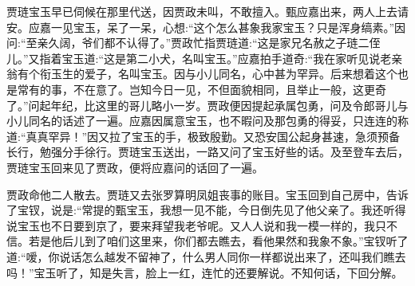 \begin{parag}
    贾琏宝玉早已伺候在那里代送，因贾政未叫，不敢擅入。甄应嘉出来，两人上去请安。应嘉一见宝玉，呆了一呆，心想:“这个怎么甚象我家宝玉？只是浑身缟素。”因问:“至亲久阔，爷们都不认得了。”贾政忙指贾琏道:“这是家兄名赦之子琏二侄儿。”又指着宝玉道:“这是第二小犬，名叫宝玉。”应嘉拍手道奇:“我在家听见说老亲翁有个衔玉生的爱子，名叫宝玉。因与小儿同名，心中甚为罕异。后来想着这个也是常有的事，不在意了。岂知今日一见，不但面貌相同，且举止一般，这更奇了。”问起年纪，比这里的哥儿略小一岁。贾政便因提起承属包勇，问及令郎哥儿与小儿同名的话述了一遍。应嘉因属意宝玉，也不暇问及那包勇的得妥，只连连的称道:“真真罕异！”因又拉了宝玉的手，极致殷勤。又恐安国公起身甚速，急须预备长行，勉强分手徐行。贾琏宝玉送出，一路又问了宝玉好些的话。及至登车去后，贾琏宝玉回来见了贾政，便将应嘉问的话回了一遍。
\end{parag}


\begin{parag}
    贾政命他二人散去。贾琏又去张罗算明凤姐丧事的账目。宝玉回到自己房中，告诉了宝钗，说是:“常提的甄宝玉，我想一见不能，今日倒先见了他父亲了。我还听得说宝玉也不日要到京了，要来拜望我老爷呢。又人人说和我一模一样的，我只不信。若是他后儿到了咱们这里来，你们都去瞧去，看他果然和我象不象。”宝钗听了道:“嗳，你说话怎么越发不留神了，什么男人同你一样都说出来了，还叫我们瞧去吗！”宝玉听了，知是失言，脸上一红，连忙的还要解说。不知何话，下回分解。
\end{parag}